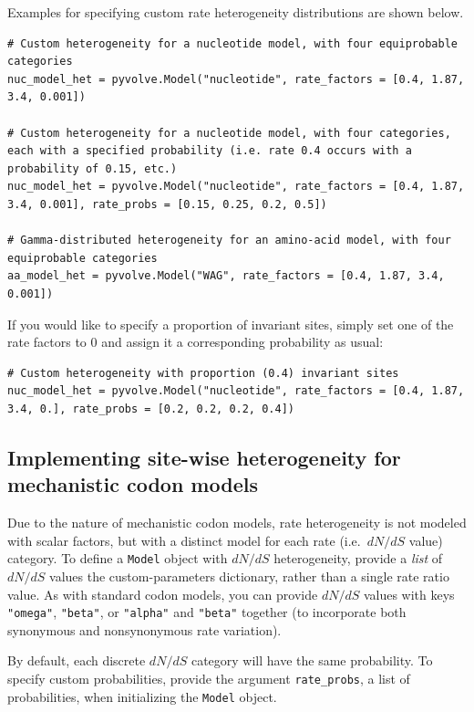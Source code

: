 \documentclass{article}
\newcommand{\code}[1]{\texttt{\small{#1}}}
\begin{document}
Examples for specifying custom rate heterogeneity distributions are shown below.
\begin{lstlisting}
# Custom heterogeneity for a nucleotide model, with four equiprobable categories
nuc_model_het = pyvolve.Model("nucleotide", rate_factors = [0.4, 1.87, 3.4, 0.001])

# Custom heterogeneity for a nucleotide model, with four categories, each with a specified probability (i.e. rate 0.4 occurs with a probability of 0.15, etc.)
nuc_model_het = pyvolve.Model("nucleotide", rate_factors = [0.4, 1.87, 3.4, 0.001], rate_probs = [0.15, 0.25, 0.2, 0.5])

# Gamma-distributed heterogeneity for an amino-acid model, with four equiprobable categories
aa_model_het = pyvolve.Model("WAG", rate_factors = [0.4, 1.87, 3.4, 0.001])
\end{lstlisting}


If you would like to specify a proportion of invariant sites, simply set one of the rate factors to 0 and assign it a corresponding probability as usual:
\begin{lstlisting}
# Custom heterogeneity with proportion (0.4) invariant sites
nuc_model_het = pyvolve.Model("nucleotide", rate_factors = [0.4, 1.87, 3.4, 0.], rate_probs = [0.2, 0.2, 0.2, 0.4])
\end{lstlisting}



\subsection{Implementing site-wise heterogeneity for mechanistic codon models}\label{sec:sitehet_codon}

Due to the nature of mechanistic codon models, rate heterogeneity is not modeled with scalar factors, but with a distinct model for each rate (i.e.\, $dN/dS$ value) category. To define a \code{Model} object with $dN/dS$ heterogeneity, provide a \emph{list} of $dN/dS$ values the custom-parameters dictionary, rather than a single rate ratio value. As with standard codon models, you can provide $dN/dS$ values with keys \code{"omega"}, \code{"beta"}, or \code{"alpha"} and \code{"beta"} together (to incorporate both synonymous and nonsynonymous rate variation).

By default, each discrete $dN/dS$ category will have the same probability. To specify custom probabilities, provide the argument \code{rate\_probs}, a list of probabilities, when initializing the \code{Model} object.
\end{document}
